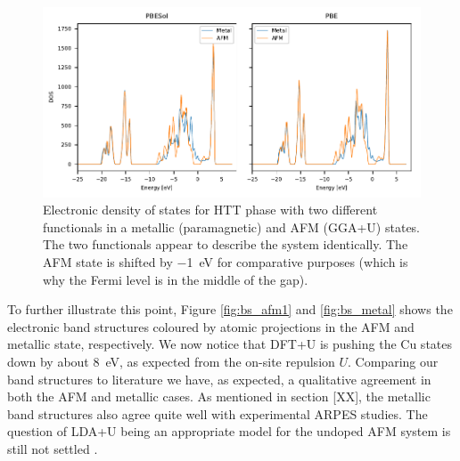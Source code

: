 \begin{figure}
    \centering
    \includegraphics[width=\textwidth]{fig/simulation/htt_dos.pdf}
    \caption[Electronic DOS: Metal and AFM]{Electronic density of states for HTT phase with two different functionals in a metallic (paramagnetic) and AFM (GGA+U) states. The two functionals appear to describe the system identically. The AFM state is shifted by \SI{-1}{\eV} for comparative purposes (which is why the Fermi level is in the middle of the gap).}
    \label{fig:edos_htt}
\end{figure}

To further illustrate this point, Figure \ref{fig:bs_afm1} and \ref{fig:bs_metal} shows the electronic band structures coloured by atomic projections in the AFM and metallic state, respectively. We now notice that DFT+U is pushing the Cu states down by about \SI{8}{\eV}, as expected from the on-site repulsion $U$. Comparing our band structures to literature we have, as expected, a qualitative agreement in both the AFM \cite{Lane2018} and metallic \cite{Matt2018, Horio2018} cases. As mentioned in section [XX], the metallic band structures also agree quite well with experimental ARPES studies. The question of LDA+U being an appropriate model for the undoped AFM system is still not settled \cite{Damascelli2003}.


